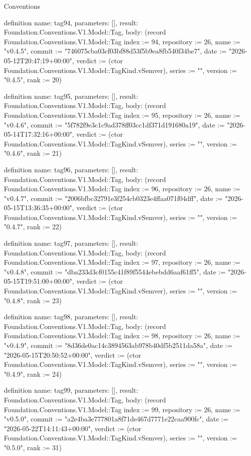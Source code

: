 \begin{lexlean}{Conventions}
\begin{semanticmodule}
definition{
  name: tag94,
  parameters: [],
  result: Foundation.Conventions.V1.Model::Tag,
  body: (record Foundation.Conventions.V1.Model::Tag {index := 94, repository := 26, name := "v0.4.5", commit := "746075cba03cf03bf88d53f5b9ea8fb540f34be7", date := "2026-05-12T20:47:19+00:00", verdict := (ctor Foundation.Conventions.V1.Model::TagKind.vSemver), series := "", version := "0.4.5", rank := 20})
}

definition{
  name: tag95,
  parameters: [],
  result: Foundation.Conventions.V1.Model::Tag,
  body: (record Foundation.Conventions.V1.Model::Tag {index := 95, repository := 26, name := "v0.4.6", commit := "5f782f9e3c1c9ad378ff03cc1df371d191680a19", date := "2026-05-14T17:32:16+00:00", verdict := (ctor Foundation.Conventions.V1.Model::TagKind.vSemver), series := "", version := "0.4.6", rank := 21})
}

definition{
  name: tag96,
  parameters: [],
  result: Foundation.Conventions.V1.Model::Tag,
  body: (record Foundation.Conventions.V1.Model::Tag {index := 96, repository := 26, name := "v0.4.7", commit := "2006bfbc32791e3f254cb0323e4ffaa071f04dff", date := "2026-05-15T13:36:35+00:00", verdict := (ctor Foundation.Conventions.V1.Model::TagKind.vSemver), series := "", version := "0.4.7", rank := 22})
}

definition{
  name: tag97,
  parameters: [],
  result: Foundation.Conventions.V1.Model::Tag,
  body: (record Foundation.Conventions.V1.Model::Tag {index := 97, repository := 26, name := "v0.4.8", commit := "dba233d3cf0155c41f89f5544ebebdd6aaf61ff5", date := "2026-05-15T19:51:00+00:00", verdict := (ctor Foundation.Conventions.V1.Model::TagKind.vSemver), series := "", version := "0.4.8", rank := 23})
}

definition{
  name: tag98,
  parameters: [],
  result: Foundation.Conventions.V1.Model::Tag,
  body: (record Foundation.Conventions.V1.Model::Tag {index := 98, repository := 26, name := "v0.4.9", commit := "8d36de0ac14c3894563ab978b40df5b2511da58a", date := "2026-05-15T20:50:52+00:00", verdict := (ctor Foundation.Conventions.V1.Model::TagKind.vSemver), series := "", version := "0.4.9", rank := 24})
}

definition{
  name: tag99,
  parameters: [],
  result: Foundation.Conventions.V1.Model::Tag,
  body: (record Foundation.Conventions.V1.Model::Tag {index := 99, repository := 26, name := "v0.5.0", commit := "a2e4ba3e777801a8f71de467d7771e22caa900fc", date := "2026-05-22T14:11:43+00:00", verdict := (ctor Foundation.Conventions.V1.Model::TagKind.vSemver), series := "", version := "0.5.0", rank := 31})
}


\end{semanticmodule}
\end{lexlean}

